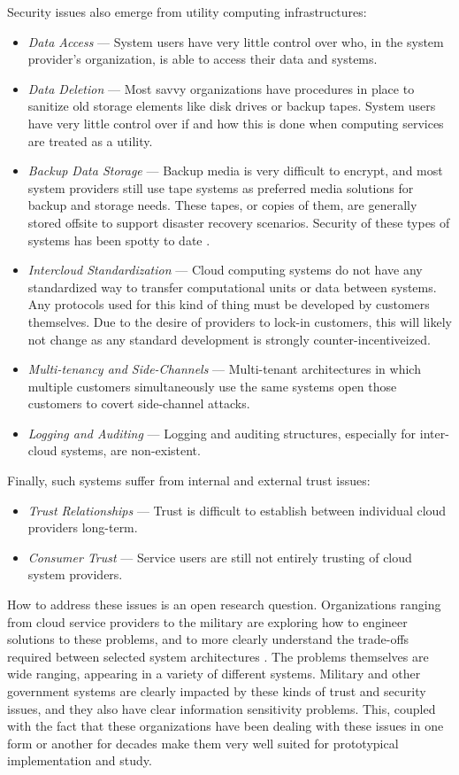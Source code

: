 \documentclass[12pt,letterpaper]{article}
\begin{document}
Security issues also emerge from utility computing infrastructures:
\begin{itemize}
\item \textit{Data Access} --- System users have very little control over who, in the system provider's organization, is able to access their data and systems.
\item \textit{Data Deletion} --- Most savvy organizations have procedures in place to sanitize old storage elements like disk drives or backup tapes.  System users have very little control over if and how this is done when computing services are treated as a utility.
\item \textit{Backup Data Storage} --- Backup media is very difficult to encrypt, and most system providers still use tape systems as preferred media solutions for backup and storage needs.  These tapes, or copies of them, are generally stored offsite to support disaster recovery scenarios.  Security of these types of systems has been spotty to date \cite{proposal:saic-breach-I,proposal:saic-breach-II,proposal:saic-breach-III}.
\item \textit{Intercloud Standardization} --- Cloud computing systems do not have any standardized way to transfer computational units or data between systems.  Any protocols used for this kind of thing must be developed by customers themselves.  Due to the desire of providers to lock-in customers, this will likely not change as any standard development is strongly counter-incentiveized. 
\item \textit{Multi-tenancy and Side-Channels} --- Multi-tenant architectures in which multiple customers simultaneously use the same systems open those customers to covert side-channel attacks.
\item \textit{Logging and Auditing} --- Logging and auditing structures, especially for inter-cloud systems, are non-existent.
\end{itemize}

Finally, such systems suffer from internal and external trust issues:
\begin{itemize}
\item \textit{Trust Relationships} --- Trust is difficult to establish between individual cloud providers long-term.
\item \textit{Consumer Trust} --- Service users are still not entirely trusting of cloud system providers.
\end{itemize}

How to address these issues is an open research question.  Organizations ranging from cloud service providers to the military are exploring how to engineer solutions to these problems, and to more clearly understand the trade-offs required between selected system architectures \cite{proposal:assured-info-sharing}.  The problems themselves are wide ranging, appearing in a variety of different systems.  Military and other government systems are clearly impacted by these kinds of trust and security issues, and they also have clear information sensitivity problems.  This, coupled with the fact that these organizations have been dealing with these issues in one form or another for decades make them very well suited for prototypical implementation and study.
\end{document}
